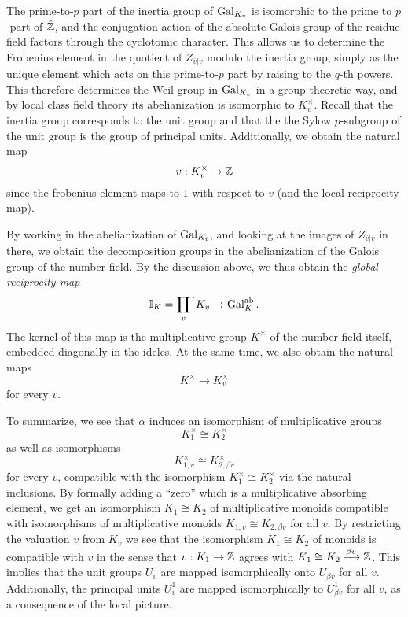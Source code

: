 The prime-to-$p$ part of the inertia group of $\operatorname{Gal}_{K_{v}}$ is isomorphic to the prime to $p$-part of $\hat{\mathbb{Z}}$, and the conjugation action of the absolute Galois group of the residue field factors through the cyclotomic character.
This allows us to determine the Frobenius element in the quotient of $Z_{\bar v|v}$ modulo the inertia group, simply as the unique element which acts on this prime-to-$p$ part by raising to the $q$-th powers.
This therefore determines the Weil group in $\operatorname{Gal}_{K_{v}}$ in a group-theoretic way, and by local class field theory its abelianization is isomorphic to $K_{v}^{\times}$.
Recall that the inertia group corresponds to the unit group and that the the Sylow $p$-subgroup of the unit group is the group of principal units.
Additionally, we obtain the natural map
\[ v : K_{v}^{\times} \to \mathbb{Z} \]
since the frobenius element maps to $1$ with respect to $v$ (and the local reciprocity map).

By working in the abelianization of $\operatorname{Gal}_{K_{i}}$, and looking at the images of $Z_{\bar v|v}$ in there, we obtain the decomposition groups in the abelianization of the Galois group of the number field.
By the discussion above, we thus obtain the \emph{global reciprocity map}
\[ \mathbb{I}_{K} = \prod_{v}{}^{'}K_{v} \to \operatorname{Gal}_{K}^{\mathrm{ab}}. \]
The kernel of this map is the multiplicative group $K^{\times}$ of the number field itself, embedded diagonally in the ideles.
At the same time, we also obtain the natural maps
\[ K^{\times} \to K_{v}^{\times} \]
for every $v$.

To summarize, we see that $\alpha$ induces an isomorphism of multiplicative groups
\[ K_{1}^{\times} \cong K_{2}^{\times} \]
as well as isomorphisms
\[ K_{1,v}^{\times} \cong K_{2,\beta v}^{\times} \]
for every $v$, compatible with the isomorphism $K_{1}^{\times} \cong K_{2}^{\times}$ via the natural inclusions.
By formally adding a ``zero'' which is a multiplicative absorbing element, we get an isomorphism $K_{1} \cong K_{2}$ of multiplicative monoids compatible with isomorphisms of multiplicative monoids $K_{1,v} \cong K_{2,\beta v}$ for all $v$.
By restricting the valuation $v$ from $K_{v}$ we see that the isomorphism $K_{1} \cong K_{2}$ of monoids is compatible with $v$ in the sense that $v : K_{1} \to \mathbb{Z}$ agrees with $K_{1} \cong K_{2} \xrightarrow{\beta v} \mathbb{Z}$.
This implies that the unit groups $U_{v}$ are mapped isomorphically onto $U_{\beta v}$ for all $v$.
Additionally, the principal units $U_{v}^{1}$ are mapped isomorphically to $U_{\beta v}^{1}$ for all $v$, as a consequence of the local picture.

